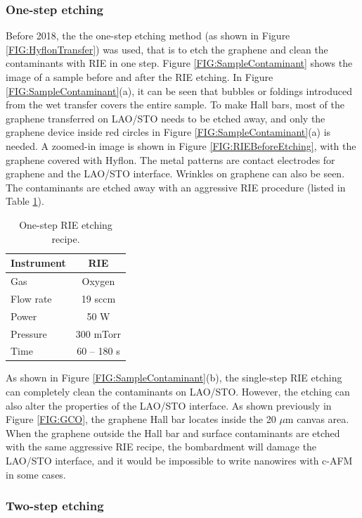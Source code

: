 \documentclass[pdflatex, sectionletters, 12pt]{pittetd}    %
\begin{document}
\subsubsection{One-step etching}

Before 2018, the the one-step etching method (as shown in Figure \ref{FIG:HyflonTransfer}) was used, that is to etch the graphene and clean the contaminants with RIE in one step. Figure \ref{FIG:SampleContaminant} shows the image of a sample before and after the RIE etching. In Figure \ref{FIG:SampleContaminant}(a), it can be seen that bubbles or foldings introduced from the wet transfer covers the entire sample. To make Hall bars, most of the graphene transferred on LAO/STO needs to be etched away, and only the graphene device inside red circles in Figure \ref{FIG:SampleContaminant}(a) is needed. A zoomed-in image is shown in Figure \ref{FIG:RIEBeforeEtching}, with the graphene covered with Hyflon. The metal patterns are contact electrodes for graphene and the LAO/STO interface. Wrinkles on graphene can also be seen. The contaminants are etched away with an aggressive RIE procedure (listed in Table \ref{TAB:RIESingleStep}). 

\begin{table}
	\centering
	\begin{tabular}{l|c}
		\hline
		Instrument    & RIE \\ \hline
		Gas    &    Oxygen \\ 
		Flow rate    &    19 sccm    \\ 
		Power & 50 W \\
		Pressure    &    300 mTorr    \\
		Time    &    60 -- 180 s \\ \hline
	\end{tabular}
	\caption{One-step RIE etching recipe.}
	\label{TAB:RIESingleStep}
\end{table}

As shown in Figure \ref{FIG:SampleContaminant}(b), the single-step RIE etching can completely clean the contaminants on LAO/STO. However, the etching can also alter the properties of the LAO/STO interface. As shown previously in Figure \ref{FIG:GCO}, the graphene Hall bar locates inside the 20 $\mu$m canvas area. When the graphene outside the Hall bar and surface contaminants are etched with the same aggressive RIE recipe, the bombardment will damage the LAO/STO interface, and it would be impossible to write nanowires with c-AFM in some cases.

\subsubsection{Two-step etching}
\end{document}
